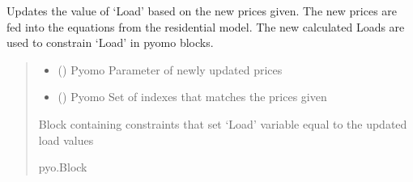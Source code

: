 \documentclass[letterpaper,10pt,english]{sphinxmanual}
\begin{document}
\begin{fulllineitems}

\begin{fulllineitems}
\label{\detokenize{src.models.residential.scripts.residential:src.models.residential.scripts.residential.residentialModule.loads}}
\pysigstartsignatures
\pysigline
{}
\pysigstopsignatures
\end{fulllineitems}


\begin{fulllineitems}
\label{\detokenize{src.models.residential.scripts.residential:src.models.residential.scripts.residential.residentialModule.make_block}}
\pysigstartsignatures
\pysiglinewithargsret
{}
{\sphinxparamcomma {}}
{}
\pysigstopsignatures
\sphinxAtStartPar
Updates the value of ‘Load’ based on the new prices given.
The new prices are fed into the equations from the residential model.
The new calculated Loads are used to constrain ‘Load’ in pyomo blocks.
\begin{quote}\begin{description}
\begin{itemize}
\item {} 
\sphinxAtStartPar
{} () \textendash{} Pyomo Parameter of newly updated prices

\item {} 
\sphinxAtStartPar
{} () \textendash{} Pyomo Set of indexes that matches the prices given

\end{itemize}

\sphinxAtStartPar
Block containing constraints that set ‘Load’ variable equal to the updated load values

\sphinxAtStartPar
pyo.Block


\end{description}
\end{quote}
\end{fulllineitems}
\end{fulllineitems}
\end{document}
